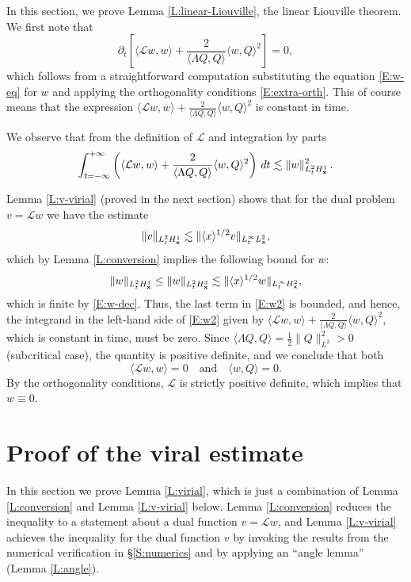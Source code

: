 \documentclass[12pt,letterpaper]{amsart}
\newcommand{\la}{\langle}
\newcommand{\ra}{\rangle}
\newcommand{\ds}{\displaystyle}
\theoremstyle{remark}
\numberwithin{equation}{section}
\numberwithin{theorem}{section}
\numberwithin{table}{section}
\begin{document}
In this section, we prove Lemma \ref{L:linear-Liouville}, the linear Liouville theorem.  We first note that 
\begin{equation}
\label{E:w1}
\partial_t \left[ \la \mathcal{L}w,w \ra + \frac{2}{\la \Lambda Q, Q \ra} \la w, Q \ra^2 \right] = 0,
\end{equation}
which follows from a straightforward computation substituting the equation \eqref{E:w-eq} for $w$ and applying the orthogonality conditions \eqref{E:extra-orth}.    This of course means that the expression $\ds \la \mathcal{L}w, w \ra + \frac{2}{\la \Lambda Q, Q \ra} \la w, Q \ra^2$ is constant in time. 

We observe that from the definition of $\mathcal{L}$ and integration by parts 
\begin{equation}
\label{E:w2}
\int_{t=-\infty}^{+\infty} \left( \la \mathcal{L}w,w \ra + \frac{2}{\la \Lambda Q, Q \ra} \la w, Q \ra^2 \right) \, dt 
\lesssim \| w\|_{L^2_t H^1_{\bf x}}^2 \,.
\end{equation}

Lemma \ref{L:v-virial} (proved in the next section) shows that for the dual problem $v = \mathcal{L}w$ we have the estimate
$$
\| v \|_{L_t^2 H_{\bf x}^1} \lesssim \| \la x \ra^{1/2} v \|_{L_t^\infty L_{\bf x}^2},
$$ 
which by Lemma \ref{L:conversion} implies the following bound for $w$: 
$$
\|  w \|_{L_t^2 H_{\bf x}^1} \leq \|w\|_{L_t^2 H_{\bf x}^3} \lesssim \| \la x \ra^{1/2} w \|_{L_t^\infty H_{\bf x}^2},
$$ 
which is finite by \eqref{E:w-dec}. Thus, the last term in \eqref{E:w2} is bounded, and hence, the integrand in the left-hand side of \eqref{E:w2} given by $\ds \la \mathcal{L}w, w \ra + \frac{2}{\la \Lambda Q, Q \ra} \la w, Q \ra^2$, which is constant in time, must be zero.   
Since $\la \Lambda Q, Q \ra =\frac12 \|Q\|^2_{L^2} > 0$ (subcritical case), the quantity is positive definite, and we conclude that both
$$
\la \mathcal{L}w, w \ra = 0 \quad \mbox{and} \quad \la  w, Q \ra = 0.
$$
By the orthogonality conditions, $\mathcal{L}$ is strictly positive definite, which implies that $w\equiv 0$.



\section{Proof of the viral estimate}
\label{S:virial}

In this section we prove Lemma \ref{L:virial}, which is just a combination of  Lemma \ref{L:conversion} and Lemma \ref{L:v-virial} below.  Lemma \ref{L:conversion} reduces the inequality to a statement about a dual function $v=\mathcal{L}w$, and Lemma \ref{L:v-virial} achieves the inequality for the dual function $v$ by invoking the results from the numerical verification in \S\ref{S:numerics} and by applying an ``angle lemma'' (Lemma \ref{L:angle}).  
\end{document}
